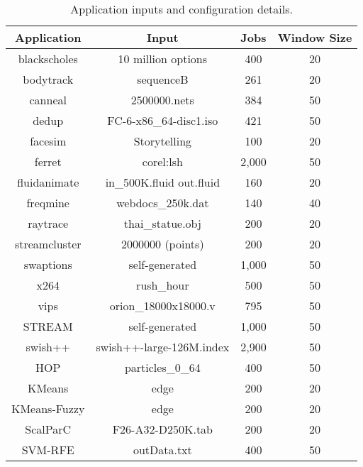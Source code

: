 \begin{table}[t]
\small
\centering
\caption{Application inputs and configuration details.}
\begin{tabular}{cccc}
  \textbf{Application} & \textbf{Input} & \textbf{Jobs} & \textbf{Window Size} \\
  \hline
  \hline
  blackscholes    & 10 million options             & 400      & 20 \\
  bodytrack       & sequenceB                      & 261      & 20 \\
  canneal         & 2500000.nets                   & 384      & 50 \\
  dedup           & FC-6-x86\_64-disc1.iso         & 421      & 50 \\
  facesim         & Storytelling                   & 100      & 20 \\
  ferret          & corel:lsh                      & 2,000    & 50 \\
  fluidanimate    & in\_500K.fluid out.fluid       & 160      & 20 \\
  freqmine        & webdocs\_250k.dat              & 140      & 40 \\
  raytrace        & thai\_statue.obj               & 200      & 20 \\
  streamcluster   & 2000000 (points)               & 200      & 20 \\
  swaptions       & self-generated                 & 1,000    & 50 \\
  x264            & rush\_hour                     & 500      & 50 \\
  vips            & orion\_18000x18000.v           & 795      & 50 \\
  STREAM          & self-generated                 & 1,000    & 50 \\
  swish++         & swish++-large-126M.index       & 2,900    & 50 \\
  HOP             & particles\_0\_64               & 400      & 50 \\
  KMeans          & edge                           & 200      & 20 \\
  KMeans-Fuzzy    & edge                           & 200      & 20 \\
  ScalParC        & F26-A32-D250K.tab              & 200      & 20 \\
  SVM-RFE         & outData.txt                    & 400      & 50 \\
  \hline
  \hline
\end{tabular}
\label{tbl:inputs}
\end{table}

